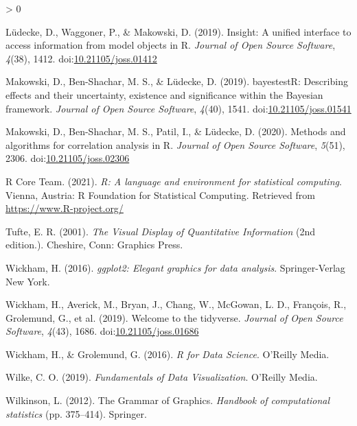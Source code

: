 \documentclass[
]{article}
\newlength{\cslhangindent}
\newenvironment{CSLReferences}[2] %
 {%
  \setlength{\parindent}{0pt}
  \ifodd #1 \everypar{\setlength{\hangindent}{\cslhangindent}}\ignorespaces\fi
  \ifnum #2 > 0
  \setlength{\parskip}{#2\baselineskip}
  \fi
 }%
 {}
\begin{document}
\begin{CSLReferences}{1}{0}
\leavevmode\hypertarget{ref-Luxfcdecke2019}{}%
Lüdecke, D., Waggoner, P., \& Makowski, D. (2019). Insight: A unified
interface to access information from model objects in {R}. \emph{Journal
of Open Source Software}, \emph{4}(38), 1412.
doi:\href{https://doi.org/10.21105/joss.01412}{10.21105/joss.01412}

\leavevmode\hypertarget{ref-Makowski2019}{}%
Makowski, D., Ben-Shachar, M. S., \& Lüdecke, D. (2019). bayestestR:
Describing effects and their uncertainty, existence and significance
within the {B}ayesian framework. \emph{Journal of Open Source Software},
\emph{4}(40), 1541.
doi:\href{https://doi.org/10.21105/joss.01541}{10.21105/joss.01541}

\leavevmode\hypertarget{ref-Makowski2020}{}%
Makowski, D., Ben-Shachar, M. S., Patil, I., \& Lüdecke, D. (2020).
Methods and algorithms for correlation analysis in {R}. \emph{Journal of
Open Source Software}, \emph{5}(51), 2306.
doi:\href{https://doi.org/10.21105/joss.02306}{10.21105/joss.02306}

\leavevmode\hypertarget{ref-base2021}{}%
R Core Team. (2021). \emph{{R}: A language and environment for
statistical computing}. Vienna, Austria: R Foundation for Statistical
Computing. Retrieved from \url{https://www.R-project.org/}

\leavevmode\hypertarget{ref-tufte2001}{}%
Tufte, E. R. (2001). \emph{The {Visual Display} of {Quantitative
Information}} (2nd edition.). {Cheshire, Conn}: {Graphics Press}.

\leavevmode\hypertarget{ref-Wickham2016}{}%
Wickham, H. (2016). \emph{{ggplot2}: Elegant graphics for data
analysis}. Springer-Verlag New York.

\leavevmode\hypertarget{ref-Wickham2019}{}%
Wickham, H., Averick, M., Bryan, J., Chang, W., McGowan, L. D.,
François, R., Grolemund, G., et al. (2019). Welcome to the {tidyverse}.
\emph{Journal of Open Source Software}, \emph{4}(43), 1686.
doi:\href{https://doi.org/10.21105/joss.01686}{10.21105/joss.01686}

\leavevmode\hypertarget{ref-wickham2016r}{}%
Wickham, H., \& Grolemund, G. (2016). \emph{{R for Data Science}}.
O'Reilly Media.

\leavevmode\hypertarget{ref-wilke2019fundamentals}{}%
Wilke, C. O. (2019). \emph{{Fundamentals of Data Visualization}}.
O'Reilly Media.

\leavevmode\hypertarget{ref-Wilkinson2012}{}%
Wilkinson, L. (2012). {The Grammar of Graphics}. \emph{Handbook of
computational statistics} (pp. 375--414). Springer.

\end{CSLReferences}
\end{document}
